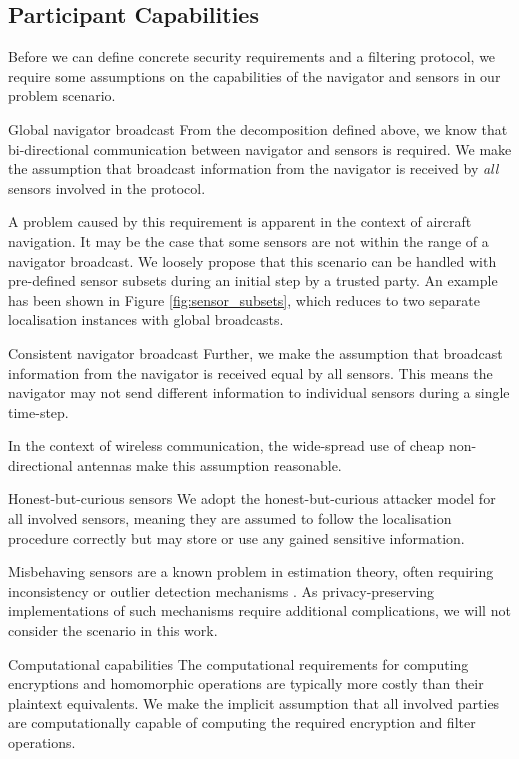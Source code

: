 \documentclass[10pt,journal,compsoc]{IEEEtran}
\theoremstyle{definition}
\theoremstyle{definition}
\theoremstyle{remark}
\begin{document}
\subsection{Participant Capabilities} \label{subsec:capabilities}
Before we can define concrete security requirements and a filtering protocol, we require some assumptions on the capabilities of the navigator and sensors in our problem scenario.
\begin{LaTeXdescription}
    \item[Global navigator broadcast] From the decomposition defined above, we know that bi-directional communication between navigator and sensors is required. We make the assumption that broadcast information from the navigator is received by \textit{all} sensors involved in the protocol.
    
    A problem caused by this requirement is apparent in the context of aircraft navigation. It may be the case that some sensors are not within the range of a navigator broadcast. We loosely propose that this scenario can be handled with pre-defined sensor subsets during an initial step by a trusted party. An example has been shown in Figure \ref{fig:sensor_subsets}, which reduces to two separate localisation instances with global broadcasts.
    \item[Consistent navigator broadcast] Further, we make the assumption that broadcast information from the navigator is received equal by all sensors. This means the navigator may not send different information to individual sensors during a single time-step.
    
    In the context of wireless communication, the wide-spread use of cheap non-directional antennas make this assumption reasonable.
    \item[Honest-but-curious sensors] We adopt the honest-but-curious attacker model for all involved sensors, meaning they are assumed to follow the localisation procedure correctly but may store or use any gained sensitive information. 
    
    Misbehaving sensors are a known problem in estimation theory, often requiring inconsistency or outlier detection mechanisms \cite{lazosSeRLocSecureRangeindependent2004,ben-galOutlierDetection2005}. As privacy-preserving implementations of such mechanisms require additional complications, we will not consider the scenario in this work.
    \item[Computational capabilities] The computational requirements for computing encryptions and homomorphic operations are typically more costly than their plaintext equivalents. We make the implicit assumption that all involved parties are computationally capable of computing the required encryption and filter operations.
\end{LaTeXdescription}
\end{document}
